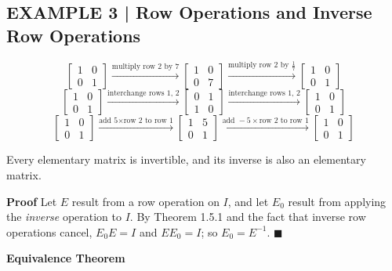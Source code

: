 \documentclass{article}
\newcommand{\redheading}[1]{{\vspace{2mm}\noindent\Large\bfseries\color{red!55!black} #1\par}\vspace{2mm}}
\theoremstyle{mystyle}
\begin{document}
\subsection*{EXAMPLE 3 | Row Operations and Inverse Row Operations}
\[
\begin{bmatrix}1&0\\0&1\end{bmatrix}
\xrightarrow{\text{multiply row 2 by }7}
\begin{bmatrix}1&0\\0&7\end{bmatrix}
\xrightarrow{\text{multiply row 2 by }\tfrac17}
\begin{bmatrix}1&0\\0&1\end{bmatrix}
\]
\[
\begin{bmatrix}1&0\\0&1\end{bmatrix}
\xrightarrow{\text{interchange rows 1, 2}}
\begin{bmatrix}0&1\\1&0\end{bmatrix}
\xrightarrow{\text{interchange rows 1, 2}}
\begin{bmatrix}1&0\\0&1\end{bmatrix}
\]
\[
\begin{bmatrix}1&0\\0&1\end{bmatrix}
\xrightarrow{\text{add 5}\times\text{row 2 to row 1}}
\begin{bmatrix}1&5\\0&1\end{bmatrix}
\xrightarrow{\text{add }-5\times\text{row 2 to row 1}}
\begin{bmatrix}1&0\\0&1\end{bmatrix}
\]

\begin{tcolorbox}[colback=red!4, colframe=red!60!black, title=Theorem 1.5.2, boxrule=0.5mm, arc=3mm]
Every elementary matrix is invertible, and its inverse is also an elementary matrix.
\end{tcolorbox}
\textbf{Proof} Let $E$ result from a row operation on $I$, and let $E_0$ result from applying the \emph{inverse} operation to $I$. By Theorem 1.5.1 and the fact that inverse row operations cancel, $E_0E=I$ and $EE_0=I$; so $E_0=E^{-1}$. $\blacksquare$

\redheading{Equivalence Theorem}
\end{document}
